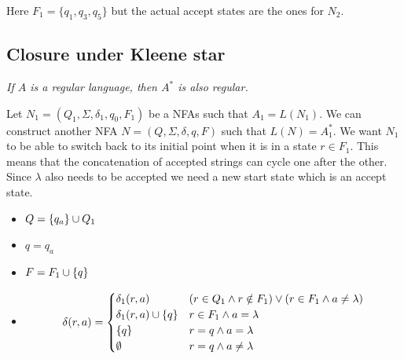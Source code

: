 \documentclass{article}
\newcommand{\emptyString}{\lambda}
\begin{document}
\begin{center}
\end{center}
Here \(F_1 = \{q_1, q_3, q_5\}\) but the actual accept states are the ones for \(N_2\).

\subsection{Closure under Kleene star}

\textit{If \(A\) is a regular language, then \(A^*\) is also regular.}

Let \(N_1 = (Q_1, \Sigma, \delta_1, q_0, F_1)\) be a NFAs such that
\(A_1 = L(N_1)\). We can construct another NFA \(N=(Q, \Sigma, \delta, q, F)\)
such that \(L(N)=A_1^*\).
We want \(N_1\) to be able to switch back to its initial point
when it is in a state \(r \in F_1\). This means that the concatenation of
accepted strings can cycle one after the other. Since \(\emptyString\)
also needs to be accepted we need a new start state which is an accept state.

\begin{itemize}
    \item \(Q = \{q_a\} \cup Q_1\)
    \item \(q = q_a\)
    \item \(F = F_1 \cup \{q\}\)
    \item \[
        \delta(r,a) =
        \begin{cases}
            \delta_1(r,a) & (r \in Q_1 \land r \notin F_1) \lor (r \in F_1 \land a \neq \emptyString) \\
            \delta_1(r,a) \union \{q\} & r \in F_1 \land a = \emptyString \\
            \{q\} & r = q \land a = \emptyString \\
            \emptyset & r = q \land a \neq \emptyString
        \end{cases}
    \]
\end{itemize}
\end{document}
